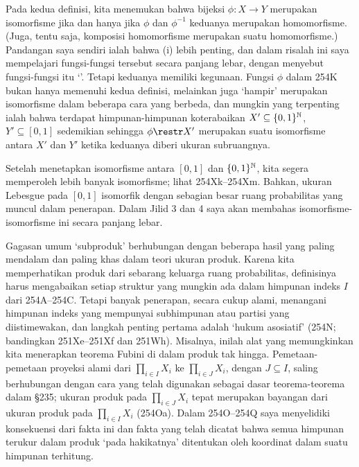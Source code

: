 {


\noindent Pada kedua definisi, kita menemukan bahwa bijeksi $\phi:X\to Y$
merupakan isomorfisme jika dan hanya jika $\phi$ dan $\phi^{-1}$ keduanya merupakan homomorfisme.
(Juga, tentu saja, komposisi homomorfisme merupakan suatu
homomorfisme.) Pandangan saya sendiri ialah bahwa (i) lebih penting, dan
dalam risalah ini saya mempelajari fungsi-fungsi tersebut secara panjang lebar, dengan menyebut
fungsi-fungsi itu `\imp'. Tetapi keduanya memiliki kegunaan. Fungsi
$\phi$ dalam 254K bukan hanya memenuhi kedua definisi, melainkan juga
`hampir' merupakan isomorfisme dalam beberapa cara yang berbeda, dan mungkin
yang terpenting ialah bahwa terdapat himpunan-himpunan koterabaikan
$X'\subseteq\{0,1\}^{\Bbb N}$,
$Y'\subseteq [0,1]$ sedemikian sehingga $\phi\restr X'$ merupakan suatu
isomorfisme antara $X'$ dan $Y'$ ketika keduanya
diberi ukuran subruangnya.

Setelah menetapkan isomorfisme antara $[0,1]$ dan
$\{0,1\}^{\Bbb N}$, kita segera memperoleh lebih banyak isomorfisme; lihat
254Xk--254Xm. Bahkan, ukuran Lebesgue pada $[0,1]$ isomorfik dengan
sebagian besar ruang probabilitas yang muncul dalam penerapan. Dalam
Jilid 3 dan 4 saya akan membahas isomorfisme-isomorfisme ini secara panjang lebar.

Gagasan umum `subproduk' berhubungan dengan beberapa hasil
yang paling mendalam dan paling khas dalam teori ukuran produk.
Karena kita memperhatikan produk dari sebarang keluarga
ruang probabilitas, definisinya harus mengabaikan setiap struktur yang mungkin ada dalam
himpunan indeks $I$ dari 254A--254C. Tetapi banyak penerapan, secara cukup
alami, menangani himpunan indeks yang mempunyai subhimpunan atau partisi yang diistimewakan, dan
langkah penting pertama adalah `hukum asosiatif' (254N; bandingkan
251Xe--251Xf dan 251Wh). Misalnya, inilah alat yang memungkinkan
kita menerapkan teorema Fubini di dalam produk tak hingga. Pemetaan-pemetaan
proyeksi alami dari $\prod_{i\in I}X_i$ ke $\prod_{i\in J}X_i$, dengan
$J\subseteq I$, saling berhubungan dengan cara yang telah digunakan sebagai
dasar teorema-teorema dalam \S235; ukuran produk pada $\prod_{i\in J}X_i$
tepat merupakan bayangan dari ukuran produk pada $\prod_{i\in I}X_i$
(254Oa). Dalam 254O--254Q saya menyelidiki konsekuensi dari fakta ini dan
fakta yang telah dicatat bahwa semua himpunan terukur dalam produk
`pada hakikatnya' ditentukan oleh koordinat dalam suatu himpunan terhitung.

}
